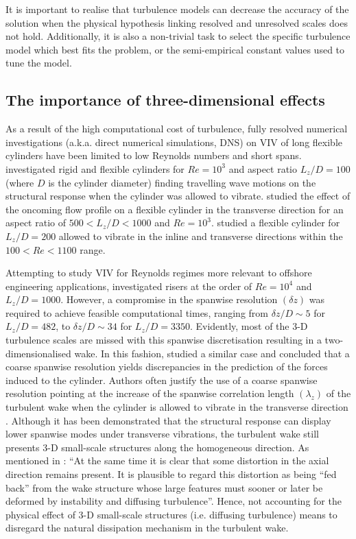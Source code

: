 \documentclass[../main.tex]{subfiles}
\begin{document}
It is important to realise that turbulence models can decrease the accuracy of the solution when the physical hypothesis linking resolved and unresolved scales does not hold.
Additionally, it is also a non-trivial task to select the specific turbulence model which best fits the problem, or the semi-empirical constant values used to tune the model.

\subsection{The importance of three-dimensional effects}

As a result of the high computational cost of turbulence, fully resolved numerical investigations (a.k.a. direct numerical simulations, DNS) on VIV of long flexible cylinders have been limited to low Reynolds numbers and short spans.
\cite{Evangelinos1999} investigated rigid and flexible cylinders for $Re=10^3$ and aspect ratio $L_z/D=100$ (where $D$ is the cylinder diameter) finding travelling wave motions on the structural response when the cylinder was allowed to vibrate.
\cite{Lucor2001} studied the effect of the oncoming flow profile on a flexible cylinder in the transverse direction for an aspect ratio of $500<L_z/D<1000$ and $Re=10^3$.
\cite{Bourguet2011} studied a flexible cylinder for  $L_z/D=200$ allowed to vibrate in the inline and transverse directions within the $100<Re<1100$ range.

Attempting to study VIV for Reynolds regimes more relevant to offshore engineering applications, \cite{Huang2011} investigated risers at the order of $Re=10^4$ and $L_z/D=1000$.
However, a compromise in the spanwise resolution $(\delta z)$ was required to achieve feasible computational times, ranging from $\delta z/D\sim5$ for $L_z/D=482$, to $\delta z/D\sim34$ for $L_z/D=3350$.
Evidently, most of the 3-D turbulence scales are missed with this spanwise discretisation resulting in a two-dimensionalised wake.
In this fashion, \cite{Holmes2006} studied a similar case and concluded that a coarse spanwise resolution yields discrepancies in the prediction of the forces induced to the cylinder.
Authors often justify the use of a coarse spanwise resolution pointing at the increase of the spanwise correlation length $(\lambda_z)$ of the turbulent wake when the cylinder is allowed to vibrate in the transverse direction \citep{Toebes1969,Blevins1974,Wu1994}.
Although it has been demonstrated that the structural response can display lower spanwise modes under transverse vibrations, the turbulent wake still presents 3-D small-scale structures along the homogeneous direction.
As mentioned in \cite{Toebes1969}: ``At the same time it is clear that some distortion in the axial direction remains present.
It is plausible to regard this distortion as being ``fed back'' from the wake structure whose large features must sooner or later be deformed by instability and
diffusing turbulence''.
Hence, not accounting for the physical effect of 3-D small-scale structures (i.e. diffusing turbulence) means to disregard the natural dissipation mechanism in the turbulent wake.
\end{document}
